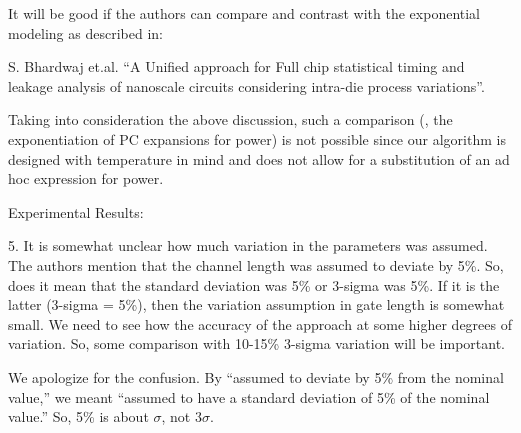 \begin{reviewer}
It will be good if the authors can compare and contrast with the exponential modeling as described in:

S. Bhardwaj et.al. ``A Unified approach for Full chip statistical timing and leakage analysis of nanoscale circuits considering intra-die process variations''.
\end{reviewer}
\begin{authors}
Taking into consideration the above discussion, such a comparison (\ie, the exponentiation of PC expansions for power) is not possible since our algorithm is designed with temperature in mind and does not allow for a substitution of an ad hoc expression for power.


\end{authors}

\begin{reviewer}
Experimental Results:

5. It is somewhat unclear how much variation in the parameters was assumed. The authors mention that the channel length was assumed to deviate by 5\%. So, does it mean that the standard deviation was 5\% or 3-sigma was 5\%. If it is the latter (3-sigma = 5\%), then the variation assumption in gate length is somewhat small. We need to see how the accuracy of the approach at some higher degrees of variation. So, some comparison with 10-15\% 3-sigma variation will be important.
\end{reviewer}
\begin{authors}
We apologize for the confusion.
By ``assumed to deviate by 5\% from the nominal value,'' we meant ``assumed to have a standard deviation of 5\% of the nominal value.''
So, 5\% is about $\sigma$, not $3 \sigma$.

\end{authors}

